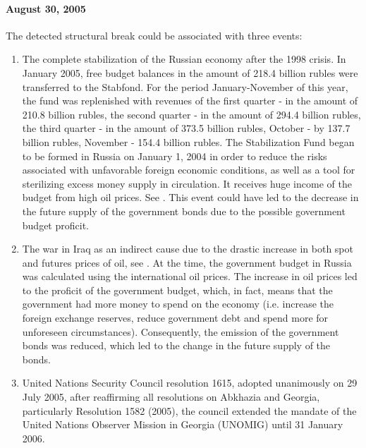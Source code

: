             \paragraph{August 30, 2005} The detected structural break could be associated with three events:
            \begin{enumerate}
                \item The complete stabilization of the Russian economy after the 1998 crisis. In January 2005, free budget 
                balances in the amount of 218.4 billion rubles were transferred to the Stabfond. For the period January-November 
                of this year, the fund was replenished with revenues of the first quarter - in the amount of 210.8 billion rubles, 
                the second quarter - in the amount of 294.4 billion rubles, the third quarter - in the amount of 373.5 billion rubles, 
                October - by 137.7 billion rubles, November - 154.4 billion rubles. The Stabilization Fund began to be formed in Russia 
                on January 1, 2004 in order to reduce the risks associated with unfavorable foreign economic conditions, as well as a 
                tool for sterilizing excess money supply in circulation. It receives huge income of the budget from high oil prices. 
                See \cite{RBK2006}. This event could have led to the decrease in the future supply of the government bonds due to the possible 
                government budget proficit.
                \item The war in Iraq as an indirect cause due to the drastic increase in both spot and futures prices of oil, see 
                \cite{IMF2005}. At the time, the government budget in Russia was calculated using the international oil prices. The 
                increase in oil prices led to the proficit of the government budget, which, in fact, means that the government had more 
                money to spend on the economy (i.e. increase the foreign exchange reserves, reduce government debt and spend more for 
                unforeseen circumstances). Consequently, the emission of the government bonds was reduced, which led to the change in 
                the future supply of the bonds.
                \item United Nations Security Council resolution 1615, adopted unanimously on 29 July 2005, after reaffirming all 
                resolutions on Abkhazia and Georgia, particularly Resolution 1582 (2005), the council extended the mandate of the 
                United Nations Observer Mission in Georgia (UNOMIG) until 31 January 2006.
            \end{enumerate}
